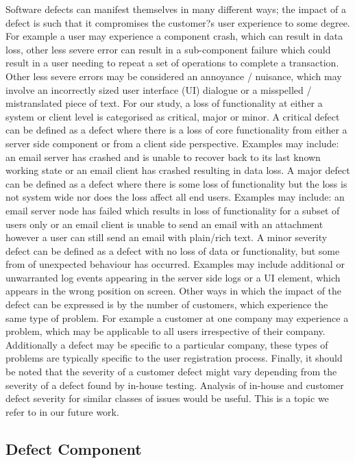 \documentclass[conference]{IEEEtran}
\begin{document}
Software defects can manifest themselves in many different ways; the impact of a defect is such that it compromises the customer?s user experience to some degree. For example a user may experience a component crash, which can result in data loss, other less severe error can result in a sub-component failure which could result in a user needing to repeat a set of operations to complete a transaction. Other less severe errors may be considered an annoyance / nuisance, which may involve an incorrectly sized user interface (UI) dialogue or a misspelled / mistranslated piece of text.
For our study, a loss of functionality at either a system or client level is categorised as critical, major or minor. A critical defect can be defined as a defect where there is a loss of core functionality from either a server side component or from a client side perspective. Examples may include: an email server has crashed and is unable to recover back to its last known working state or an email client has crashed resulting in data loss. A major defect can be defined as a defect where there is some loss of functionality but the loss is not system wide nor does the loss affect all end users. Examples may include: an email server node has failed which results in loss of functionality for a subset of users only or an email client is unable to send an email with an attachment however a user can still send an email with plain/rich text. A minor severity defect can be defined as a defect with no loss of data or functionality, but some from of unexpected behaviour has occurred. Examples may include additional or unwarranted log events appearing in the server side logs or a UI element, which appears in the wrong position on screen. 
Other ways in which the impact of the defect can be expressed is by the number of customers, which experience the same type of problem. For example a customer at one company may experience a problem, which may be applicable to all users irrespective of their company. Additionally a defect may be specific to a particular company, these types of problems are typically specific to the user registration process. 
Finally, it should be noted that the severity of a customer defect might vary depending from the severity of a defect found by in-house testing. Analysis of in-house and customer defect severity for similar classes of issues would be useful. This is a topic we refer to in our future work.

\subsection{Defect Component}
\end{document}
